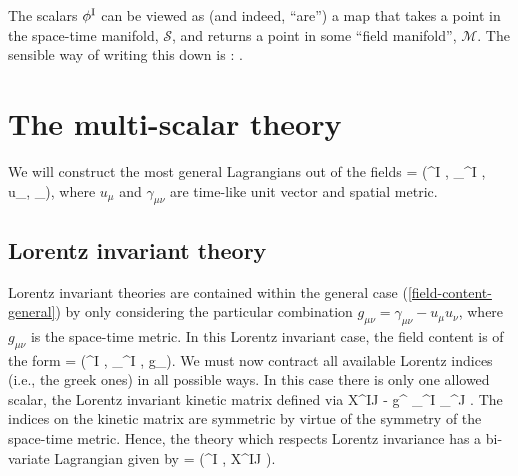 \documentclass[amsmath,amssymb,12pt,eqsecnum]{article}
\newcommand{\fiu}[2]{#1^{\scriptsize\rm #2 }}
\newcommand{\stmanif}[0]{\mathcal{S}}
\newcommand{\fmanif}[0]{\mathcal{M}}
\begin{document}
The scalars $\fiu{\phi}{I}$ can be viewed as (and indeed,  ``are'')  a map that takes a point in the space-time manifold, $\stmanif$, and returns a point in some ``field manifold'', $\fmanif$. The sensible way of writing this down is
\bea
\phi : \stmanif\longrightarrow \fmanif.
\eea


\section{The multi-scalar theory}
We will construct the most general Lagrangians out of the fields
\bea
\label{field-content-general}
\ld = \ld(\fiu{\phi}{I}, \nabla_{\mu}\fiu{\phi}{I}, u_{\mu}, \gamma_{\mu\nu}),
\eea
where $u_{\mu}$ and $\gamma_{\mu\nu}$ are  time-like unit vector and spatial metric. 
\subsection{Lorentz invariant theory}
Lorentz invariant theories are contained within the general case (\ref{field-content-general}) by  only considering the particular combination $g_{\mu\nu} = \gamma_{\mu\nu} - u_{\mu}u_{\nu}$, where $g_{\mu\nu}$ is the space-time metric. In this Lorentz invariant case, the field content is of the form
\bea
\ld = \ld(\fiu{\phi}{I}, \nabla_{\mu}\fiu{\phi}{I}, g_{\mu\nu}).
\eea
We must now contract all available Lorentz indices (i.e., the greek ones) in all possible ways. In this case there is only one allowed scalar, the Lorentz invariant kinetic matrix defined via
\bea
\label{eq:LI-kin-mat}
 \fiu{X}{IJ}  - \half g^{\mu\nu} \nabla_{\mu}\fiu{\phi}{I} \nabla_{\nu}\fiu{\phi}{J}.
\eea
The indices on the kinetic matrix are symmetric by virtue of the symmetry of the space-time metric.
Hence, the theory which respects Lorentz invariance has a bi-variate Lagrangian given by
\bea
\ld = \ld(\fiu{\phi}{I},   \fiu{X}{IJ}).
\eea
\end{document}
